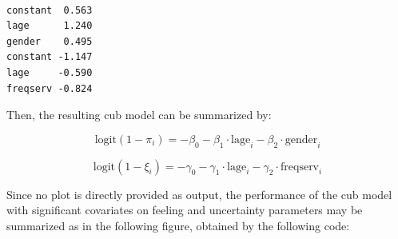 \documentclass[
  letterpaper,
  DIV=11,
  numbers=noendperiod]{scrartcl}
\begin{document}
\begin{verbatim}
               
constant  0.563
lage      1.240
gender    0.495
constant -1.147
lage     -0.590
freqserv -0.824
\end{verbatim}

Then, the resulting cub model can be summarized by:

\[
\text{logit}(1 - \pi_i) = -\beta_0 - \beta_1 \cdot \text{lage}_i - \beta_2 \cdot \text{gender}_i
\]

\[
\text{logit}(1 - \xi_i) = -\gamma_0 - \gamma_1 \cdot \text{lage}_i - \gamma_2 \cdot \text{freqserv}_i
\]

Since no plot is directly provided as output, the performance of the cub
model with significant covariates on feeling and uncertainty parameters
may be summarized as in the following figure, obtained by the following
code:
\end{document}

